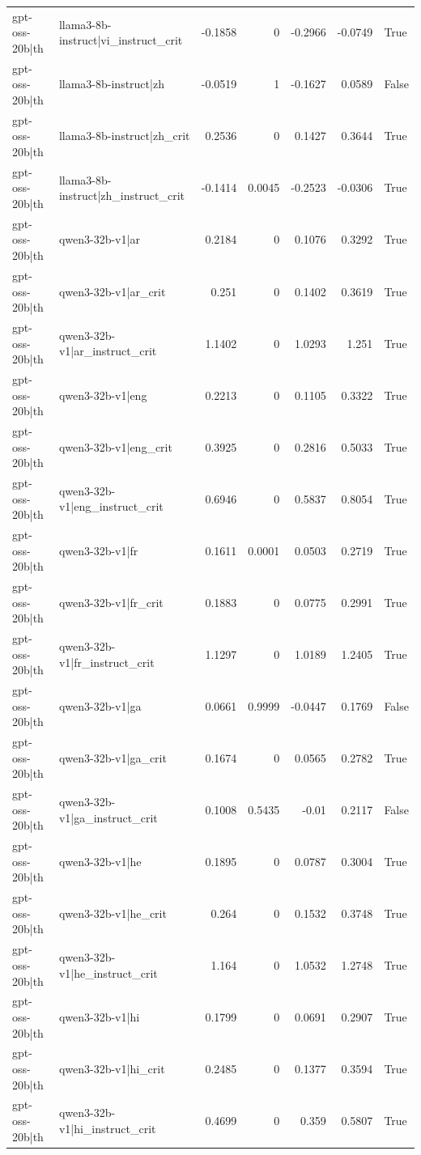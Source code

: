 \begin{table}
\begin{tabular}{l l r r r r l}
gpt-oss-20b|th & llama3-8b-instruct|vi_instruct_crit & -0.1858 & 0 & -0.2966 & -0.0749 & True \\
gpt-oss-20b|th & llama3-8b-instruct|zh & -0.0519 & 1 & -0.1627 & 0.0589 & False \\
gpt-oss-20b|th & llama3-8b-instruct|zh_crit & 0.2536 & 0 & 0.1427 & 0.3644 & True \\
gpt-oss-20b|th & llama3-8b-instruct|zh_instruct_crit & -0.1414 & 0.0045 & -0.2523 & -0.0306 & True \\
gpt-oss-20b|th & qwen3-32b-v1|ar & 0.2184 & 0 & 0.1076 & 0.3292 & True \\
gpt-oss-20b|th & qwen3-32b-v1|ar_crit & 0.251 & 0 & 0.1402 & 0.3619 & True \\
gpt-oss-20b|th & qwen3-32b-v1|ar_instruct_crit & 1.1402 & 0 & 1.0293 & 1.251 & True \\
gpt-oss-20b|th & qwen3-32b-v1|eng & 0.2213 & 0 & 0.1105 & 0.3322 & True \\
gpt-oss-20b|th & qwen3-32b-v1|eng_crit & 0.3925 & 0 & 0.2816 & 0.5033 & True \\
gpt-oss-20b|th & qwen3-32b-v1|eng_instruct_crit & 0.6946 & 0 & 0.5837 & 0.8054 & True \\
gpt-oss-20b|th & qwen3-32b-v1|fr & 0.1611 & 0.0001 & 0.0503 & 0.2719 & True \\
gpt-oss-20b|th & qwen3-32b-v1|fr_crit & 0.1883 & 0 & 0.0775 & 0.2991 & True \\
gpt-oss-20b|th & qwen3-32b-v1|fr_instruct_crit & 1.1297 & 0 & 1.0189 & 1.2405 & True \\
gpt-oss-20b|th & qwen3-32b-v1|ga & 0.0661 & 0.9999 & -0.0447 & 0.1769 & False \\
gpt-oss-20b|th & qwen3-32b-v1|ga_crit & 0.1674 & 0 & 0.0565 & 0.2782 & True \\
gpt-oss-20b|th & qwen3-32b-v1|ga_instruct_crit & 0.1008 & 0.5435 & -0.01 & 0.2117 & False \\
gpt-oss-20b|th & qwen3-32b-v1|he & 0.1895 & 0 & 0.0787 & 0.3004 & True \\
gpt-oss-20b|th & qwen3-32b-v1|he_crit & 0.264 & 0 & 0.1532 & 0.3748 & True \\
gpt-oss-20b|th & qwen3-32b-v1|he_instruct_crit & 1.164 & 0 & 1.0532 & 1.2748 & True \\
gpt-oss-20b|th & qwen3-32b-v1|hi & 0.1799 & 0 & 0.0691 & 0.2907 & True \\
gpt-oss-20b|th & qwen3-32b-v1|hi_crit & 0.2485 & 0 & 0.1377 & 0.3594 & True \\
gpt-oss-20b|th & qwen3-32b-v1|hi_instruct_crit & 0.4699 & 0 & 0.359 & 0.5807 & True \\

\end{tabular}
\end{table}
